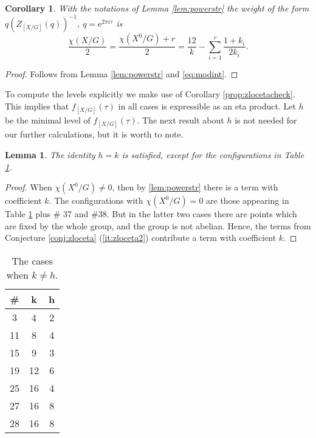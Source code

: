 \documentclass[11pt,a4paper]{amsart}
\newtheorem{lemma}[theorem]{Lemma}
\newtheorem{corollary}[theorem]{Corollary}
\theoremstyle{definition}
\begin{document}
\begin{corollary}
With the notations of Lemma \ref{lem:powerstr} the weight of the form $q(Z_{[X/G]}(q))^{-1}$, $q=\mathrm{e}^{2 \pi i \tau}$ is
\begin{equation} \label{eq:weight} \frac{\chi(X/G)}{2}=\frac{\chi(X^0/G)+r}{2}=\frac{12}{k}-\sum_{i=1}^r \frac{1+k_i}{2k_i}. \end{equation}
\end{corollary}
\begin{proof}
Follows from Lemma \ref{lem:powerstr} and \eqref{eq:modint}.
\end{proof}

To compute the levels explicitly we make use of Corollary \ref{prop:zlocetacheck}. This implies that $f_{[X/G]}(\tau)$ in all cases is expressible as an eta product. Let $h$ be the minimal level of $f_{[X/G]}(\tau)$. The next result about $h$ is not needed for our further calculations, but it is worth to note.
\begin{lemma}
The identity $h=k$ is satisfied, except for the configurations in Table \ref{table:kh}. 
\end{lemma}
\begin{proof}
	When $\chi(X^0/G)\neq 0$, then by \ref{lem:powerstr} there is a term with coefficient $k$. The configurations with $\chi(X^0/G)=0$ are those appearing in Table \ref{table:kh} plus \# 37 and \#38. But in the latter two cases there are points which are fixed by the whole group, and the group is not abelian. Hence, the terms from Conjecture \ref{conj:zloceta} (\ref{it:zloceta2}) contribute a term with coefficient $k$.
\end{proof}

\begin{table}

\begin{tabular}{|c|c|c|}
	\hline 
	\# & k & h \\
	\hline
	3 & 4 & 2 \\
	11 & 8 & 4 \\
	15 & 9 & 3 \\
	19 & 12 & 6 \\
	25 & 16 & 4 \\
	27 & 16 & 8\\
	28 & 16 & 8 \\
	\hline
\end{tabular}
	\vspace{0.2in}
\caption{The cases when $k \neq h$.}
	\label{table:kh}
\end{table}
\end{document}

